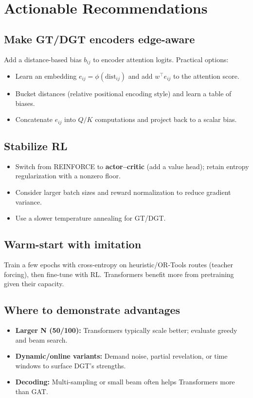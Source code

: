 \documentclass[11pt,a4paper]{article}
\begin{document}
\section{Actionable Recommendations}
\subsection{Make GT/DGT encoders edge-aware}
Add a distance-based bias $b_{ij}$ to encoder attention logits. Practical options:
\begin{itemize}[leftmargin=*]
  \item Learn an embedding $e_{ij}=\phi(\text{dist}_{ij})$ and add $w^\top e_{ij}$ to the attention score.
  \item Bucket distances (relative positional encoding style) and learn a table of biases.
  \item Concatenate $e_{ij}$ into $Q/K$ computations and project back to a scalar bias.
\end{itemize}

\subsection{Stabilize RL}
\begin{itemize}[leftmargin=*]
  \item Switch from REINFORCE to \textbf{actor--critic} (add a value head); retain entropy regularization with a nonzero floor.
  \item Consider larger batch sizes and reward normalization to reduce gradient variance.
  \item Use a slower temperature annealing for GT/DGT.
\end{itemize}

\subsection{Warm-start with imitation}
Train a few epochs with cross-entropy on heuristic/OR-Tools routes (teacher forcing), then fine-tune with RL. Transformers benefit more from pretraining given their capacity.

\subsection{Where to demonstrate advantages}
\begin{itemize}[leftmargin=*]
  \item \textbf{Larger N (50/100):} Transformers typically scale better; evaluate greedy and beam search.
  \item \textbf{Dynamic/online variants:} Demand noise, partial revelation, or time windows to surface DGT's strengths.
  \item \textbf{Decoding:} Multi-sampling or small beam often helps Transformers more than GAT.
\end{itemize}
\end{document}
